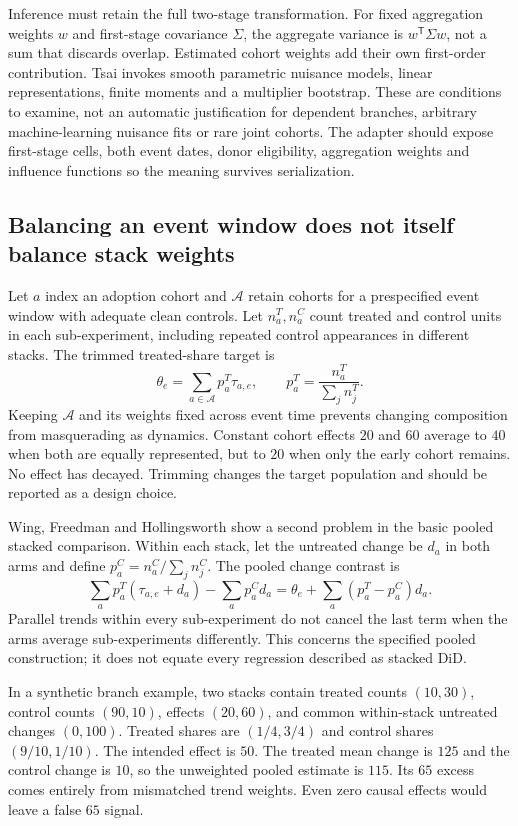 Inference must retain the full two-stage transformation. For fixed aggregation weights $w$ and first-stage covariance
$\Sigma$, the aggregate variance is $w^{\mathsf T}\Sigma w$, not a sum that discards overlap. Estimated cohort weights
add their own first-order contribution. Tsai invokes smooth parametric nuisance models, linear representations, finite
moments and a multiplier bootstrap. These are conditions to examine, not an automatic justification for dependent branches,
arbitrary machine-learning nuisance fits or rare joint cohorts. The adapter should expose first-stage cells, both event
dates, donor eligibility, aggregation weights and influence functions so the meaning survives serialization.~\citep{exec28_panel_tsai}

\subsection{Balancing an event window does not itself balance stack weights}

Let $a$ index an adoption cohort and $\mathcal A$ retain cohorts for a prespecified event window with adequate clean
controls. Let $n_a^T,n_a^C$ count treated and control units in each sub-experiment, including repeated control appearances
in different stacks. The trimmed treated-share target is
\[
 \theta_e=\sum_{a\in\mathcal A}p_a^T\tau_{a,e},\qquad p_a^T=\frac{n_a^T}{\sum_j n_j^T}.
\]
Keeping $\mathcal A$ and its weights fixed across event time prevents changing composition from masquerading as dynamics.
Constant cohort effects $20$ and $60$ average to $40$ when both are equally represented, but to $20$ when only the early
cohort remains. No effect has decayed. Trimming changes the target population and should be reported as a design choice.
\citep{exec28_panel_wing,exec28_panel_reference}

Wing, Freedman and Hollingsworth show a second problem in the basic pooled stacked comparison. Within each stack, let
the untreated change be $d_a$ in both arms and define $p_a^C=n_a^C/\sum_jn_j^C$. The pooled change contrast is
\[
 \sum_a p_a^T(\tau_{a,e}+d_a)-\sum_a p_a^C d_a
 =\theta_e+\sum_a(p_a^T-p_a^C)d_a.
\]
Parallel trends within every sub-experiment do not cancel the last term when the arms average sub-experiments differently.
This concerns the specified pooled construction; it does not equate every regression described as stacked DiD.
\citep{exec28_panel_wing}

In a synthetic branch example, two stacks contain treated counts $(10,30)$, control counts $(90,10)$, effects $(20,60)$,
and common within-stack untreated changes $(0,100)$. Treated shares are $(1/4,3/4)$ and control shares $(9/10,1/10)$.
The intended effect is $50$. The treated mean change is $125$ and the control change is $10$, so the unweighted pooled
estimate is $115$. Its $65$ excess comes entirely from mismatched trend weights. Even zero causal effects would leave
a false $65$ signal.~\citep{exec28_panel_reference}

